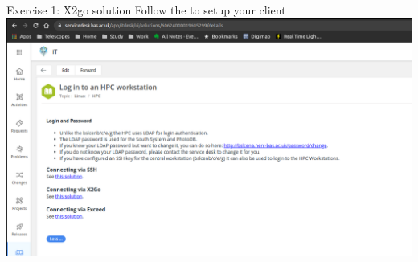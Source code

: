 \documentclass[handout]{beamer} %
\begin{document}
{
%
\begin{frame}{Exercise 1: X2go solution}
\text Follow the \href{https://servicedesk.bas.ac.uk/app/itdesk/ui/solutions/60624000019605299/details}{\color{blue}{service desk solution}} to setup your client
\includegraphics[scale=0.22]{servicedesk-x2go-solution.png}
\end{frame}
}
\end{document}
